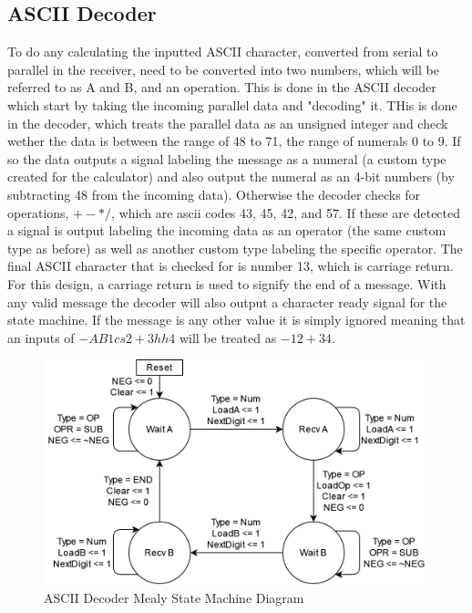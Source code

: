 \documentclass[11pt]{article}
\begin{document}
\subsection{ASCII Decoder}

To do any calculating the inputted ASCII character, converted from serial to parallel in the receiver, need to be converted into two numbers, which will be referred to as A and B, and an operation.
This is done in the ASCII decoder which start by taking the incoming parallel data and "decoding" it.
THis is done in the decoder, which treats the parallel data as an unsigned integer and check wether the data is between the range of 48 to 71, the range of numerals 0 to 9.
If so the data outputs a signal labeling the message as a numeral (a custom type created for the calculator) and also output the numeral as an 4-bit numbers (by subtracting 48 from the incoming data).
Otherwise the decoder checks for operations, $+-*/$, which are ascii codes 43, 45, 42, and 57.
If these are detected a signal is output labeling the incoming data as an operator (the same custom type as before) as well as another custom type labeling the specific operator.
The final ASCII character that is checked for is number 13, which is carriage return.
For this design, a carriage return is used to signify the end of a message.
With any valid message the decoder will also output a character ready signal for the state machine.
If the message is any other value it is simply ignored meaning that an inputs of $-AB1cs 2 + 3 hh4$ will be treated as $-12+34$.

\begin{figure}[H]        
    \centering
    \includegraphics[width=.66\textwidth]{DecoderSM.drawio.png}
    \caption{ASCII Decoder Mealy State Machine Diagram}
    \label{fig:decodersm}
\end{figure} 
\end{document}
